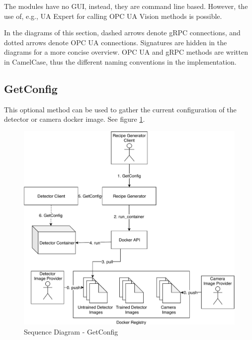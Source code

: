 The modules have no GUI, instead, they are command line based. However, the use of, e.g., UA Expert for calling OPC UA Vision methods is possible.

In the diagrams of this section, dashed arrows denote gRPC connections, and dotted arrows denote OPC UA connections. Signatures are hidden in the diagrams for a more concise overview. OPC UA and gRPC methods are written in CamelCase, thus the different naming conventions in the implementation.

\subsection{GetConfig}\label{subsec:getconfig}
This optional method can be used to gather the current configuration of the detector or camera docker image. See figure \ref{fig:SequenceDiagram-GetConfig}.

\begin{figure}[ht]
	\centering
  \includegraphics[width=\textwidth]{img/SequenceDiagram-GetConfig.pdf}
	\caption{Sequence Diagram - GetConfig}
	\label{fig:SequenceDiagram-GetConfig}
\end{figure}

